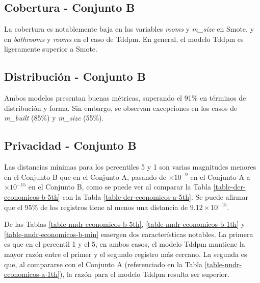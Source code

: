 

\newpage
\subsection{Cobertura - Conjunto B}
La cobertura es notablemente baja en las variables \emph{rooms} y \emph{m\_size} en Smote, y en \emph{bathrooms} y \emph{rooms} en el caso de Tddpm. En general, el modelo Tddpm es ligeramente superior a Smote.



\newpage
\subsection{Distribución - Conjunto B}
Ambos modelos presentan buenas métricas, superando el 91\% en términos de distribución y forma. Sin embargo, se observan excepciones en los casos de \emph{m\_built} (85\%) y \emph{m\_size} (55\%).


\newpage
\subsection{Privacidad - Conjunto B}
Las distancias mínimas para los percentiles 5 y 1 son varias magnitudes menores en el Conjunto B que en el Conjunto A, pasando de $\times 10^{-9}$ en el Conjunto A a $\times 10^{-15}$ en el Conjunto B, como se puede ver al comparar la Tabla \ref{table-dcr-economicos-b-5th} con la Tabla \ref{table-dcr-economicos-a-5th}. Se puede afirmar que el 95\% de los registros tiene al menos una distancia de $9.12 \times 10^{-15}$.




\newpage
De las Tablas \ref{table-nndr-economicos-b-5th}, \ref{table-nndr-economicos-b-1th} y \ref{table-nndr-economicos-b-min} emergen dos características notables. La primera es que en el percentil 1 y el 5, en ambos casos, el modelo Tddpm mantiene la mayor razón entre el primer y el segundo registro más cercano. La segunda es que, al compararse con el Conjunto A (referenciado en la Tabla \ref{table-nndr-economicos-a-1th}), la razón para el modelo Tddpm resulta ser superior.



\newpage
